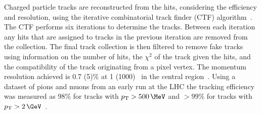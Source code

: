 %
Charged particle tracks are reconstructed from the hits, considering the efficiency and resolution, 
using the iterative combinatorial track finder (CTF) algorithm~\cite{tracker_early}. The CTF performs 
six iterations to determine the tracks. Between each iteration any hits that are assigned to tracks in the
previous iteration are removed from the collection. The final track collection is then filtered to remove fake tracks using 
information on the number of hits, the $\chi^2$ of the track given the hits, and the compatibility of the track originating from a pixel vertex. The momentum 
resolution achieved is 0.7 (5)\% at 1 (1000) \GeV~in the central region~\cite{tracker_early}. Using a dataset of pions and muons from an early run 
at the LHC the tracking efficiency was measured as 98\% for tracks with $\pt > 500\,\MeV$ and $>99\%$ for tracks with $\pt > 2\,\GeV$~\cite{tracker_eff}.

